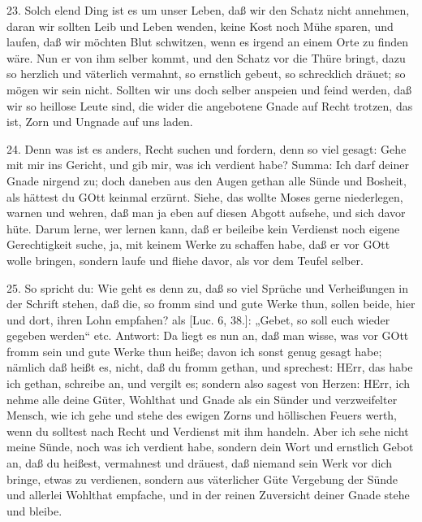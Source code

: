 23. Solch elend Ding ist es um unser Leben, daß wir den Schatz nicht annehmen, daran wir sollten Leib und Leben wenden, keine Kost noch Mühe sparen, und laufen, daß wir möchten Blut schwitzen, wenn es irgend an einem Orte zu finden wäre. Nun er von ihm selber kommt, und den Schatz vor die Thüre bringt, dazu so herzlich und väterlich vermahnt, so ernstlich gebeut, so schrecklich dräuet; so mögen wir sein nicht. Sollten wir uns doch selber anspeien und feind werden, daß wir so heillose Leute sind, die wider die angebotene Gnade auf Recht trotzen, das ist, Zorn und Ungnade auf uns laden.

24. Denn was ist es anders, Recht suchen und fordern, denn so viel gesagt: Gehe mit mir ins Gericht, und gib mir, was ich verdient habe? Summa: Ich darf deiner Gnade nirgend zu; doch daneben aus den Augen gethan alle Sünde und Bosheit, als hättest du GOtt keinmal erzürnt. Siehe, das wollte Moses gerne niederlegen, warnen und wehren, daß man ja eben auf diesen Abgott aufsehe, und sich davor hüte. Darum lerne, wer lernen kann, daß er beileibe kein Verdienst noch eigene Gerechtigkeit suche, ja, mit keinem Werke zu schaffen habe, daß er vor GOtt wolle bringen, sondern laufe und fliehe davor, als vor dem Teufel selber.

25. So spricht du: Wie geht es denn zu, daß so viel Sprüche und Verheißungen in der Schrift stehen, daß die, so fromm sind und gute Werke thun, sollen beide, hier und dort, ihren Lohn empfahen? als [Luc. 6, 38.]: „Gebet, so soll euch wieder gegeben werden“ etc. Antwort: Da liegt es nun an, daß man wisse, was vor GOtt fromm sein und gute Werke thun heiße; davon ich sonst genug gesagt habe; nämlich daß heißt es, nicht, daß du fromm gethan, und sprechest: HErr, das habe ich gethan, schreibe an, und vergilt es; sondern also sagest von Herzen: HErr, ich nehme alle deine Güter, Wohlthat und Gnade als ein Sünder und verzweifelter Mensch, wie ich gehe und stehe des ewigen Zorns und höllischen Feuers werth, wenn du solltest nach Recht und Verdienst mit ihm handeln. Aber ich sehe nicht meine Sünde, noch was ich verdient habe, sondern dein Wort und ernstlich Gebot an, daß du heißest, vermahnest und dräuest, daß niemand sein Werk vor dich bringe, etwas zu verdienen, sondern aus väterlicher Güte Vergebung der Sünde und allerlei Wohlthat empfache, und in der reinen Zuversicht deiner Gnade stehe und bleibe.

